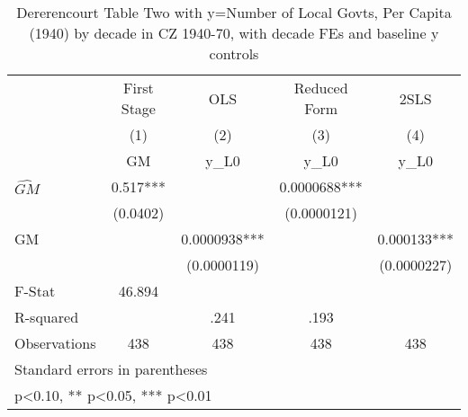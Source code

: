 \begin{table}[htbp]\centering
\def\sym#1{\ifmmode^{#1}\else\(^{#1}\)\fi}
\caption{Dererencourt Table Two with y=Number of Local Govts, Per Capita (1940) by decade in CZ 1940-70, with decade FEs and baseline y controls}
\begin{tabular}{l*{4}{c}}
\toprule
                    & First Stage   &         OLS   &Reduced Form   &        2SLS   \\
                    &\multicolumn{1}{c}{(1)}&\multicolumn{1}{c}{(2)}&\multicolumn{1}{c}{(3)}&\multicolumn{1}{c}{(4)}\\
                    &\multicolumn{1}{c}{GM}&\multicolumn{1}{c}{y\_L0}&\multicolumn{1}{c}{y\_L0}&\multicolumn{1}{c}{y\_L0}\\
\midrule
$\hat{GM}$          &       0.517***&               &   0.0000688***&               \\
                    &    (0.0402)   &               & (0.0000121)   &               \\
\addlinespace
GM                  &               &   0.0000938***&               &    0.000133***\\
                    &               & (0.0000119)   &               & (0.0000227)   \\
\midrule
F-Stat              &      46.894   &               &               &               \\
R-squared           &               &        .241   &        .193   &               \\
Observations        &         438   &         438   &         438   &         438   \\
\bottomrule
\multicolumn{5}{l}{\footnotesize Standard errors in parentheses}\\
\multicolumn{5}{l}{\footnotesize * p<0.10, ** p<0.05, *** p<0.01}\\
\end{tabular}
\end{table}
